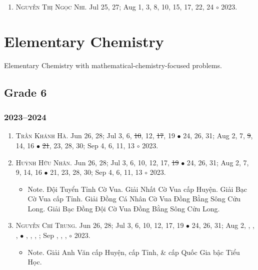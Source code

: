 \documentclass{article}
\begin{document}
\begin{enumerate}
	\item \textsc{Nguyễn Thị Ngọc Nhi.} {\sf[In]} Jul 25, 27; Aug 1, 3, 8, 10, 15, 17, 22, 24 $\circ$ 2023.
\end{enumerate}


\section{Elementary Chemistry}
Elementary Chemistry with mathematical-chemistry-focused problems.

\subsection{Grade 6}

\subsubsection{2023--2024}

\begin{enumerate}
	\item \textsc{Trần Khánh Hà.} {\sf[In]} Jun 26, 28; Jul 3, 6, \st{10}, 12, \st{17}, 19 $\bullet$ 24, 26, 31; Aug 2, 7, \st{9}, 14, 16 $\bullet$ \st{21}, 23, 28, 30; Sep 4, 6, 11, 13 $\circ$ 2023. 
	\item \textsc{Huỳnh Hữu Nhân.} {\sf[In]} Jun 26, 28; Jul 3, 6, 10, 12, 17, \st{19} $\bullet$ 24, 26, 31; Aug 2, 7, 9, 14, 16 $\bullet$ 21, 23, 28, 30; Sep 4, 6, 11, 13 $\circ$ 2023.
	\begin{itemize}
		\item {\sf Note.} Đội Tuyển Tỉnh Cờ Vua. Giải Nhất Cờ Vua cấp Huyện. Giải Bạc Cờ Vua cấp Tỉnh. Giải Đồng Cá Nhân Cờ Vua Đồng Bằng Sông Cửu Long. Giải Bạc Đồng Đội Cờ Vua Đồng Bằng Sông Cửu Long.
	\end{itemize}
	\item \textsc{Nguyễn Chí Trung.} {\sf[In]} Jun 26, 28; Jul 3, 6, 10, 12, 17, 19 $\bullet$ 24, 26, 31; Aug 2, , , ,  $\bullet$ , , , ; Sep , , ,  $\circ$ 2023.
	\begin{itemize}
		\item {\sf Note.} Giải Anh Văn cấp Huyện, cấp Tỉnh, \& cấp Quốc Gia bậc Tiểu Học.
	\end{itemize}
\end{enumerate}
\end{document}
